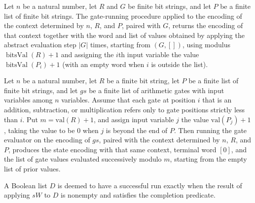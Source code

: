 \begin{theorem}
\label{Randomized.PIT.gateRun_eq}
\leanok
{}
Let $n$ be a natural number, let $R$ and $G$ be finite bit strings, and let $P$ be a
finite list of finite bit strings. The gate-running procedure applied to the encoding of
the context determined by $n$, $R$, and $P$, paired with $G$, returns the encoding of
that context together with the word and list of values obtained by applying the abstract
evaluation step $|G|$ times, starting from $(G,[])$, using modulus $\operatorname{bitsVal}(R)+1$ and
assigning the $i$th input variable the value $\operatorname{bitsVal}(P_i)+1$ (with an empty word when
$i$ is outside the list).
\end{theorem}

\begin{theorem}
\label{Randomized.PIT.gateRun_encodeGates}
\leanok
{}
Let $n$ be a natural number, let $R$ be a finite bit string, let $P$ be a finite list of
finite bit strings, and let $gs$ be a finite list of arithmetic gates with input
variables among $n$ variables. Assume that each gate at position $i$ that is an
addition, subtraction, or multiplication refers only to gate positions strictly less
than $i$. Put $m=\mathrm{val}(R)+1$, and assign input variable $j$ the value
$\mathrm{val}(P_j)+1$, taking the value to be $0$ when $j$ is beyond the end of $P$.
Then running the gate evaluator on the encoding of $gs$, paired with the context
determined by $n$, $R$, and $P$, produces the state encoding with that same context,
terminal word $[0]$, and the list of gate values evaluated successively modulo $m$,
starting from the empty list of prior values.
\end{theorem}

\begin{definition}
\label{Randomized.PIT.runOk}
\leanok
{}
A Boolean list $D$ is deemed to have a successful run exactly when the result of
applying $sW$ to $D$ is nonempty and satisfies the completion predicate.
\end{definition}

